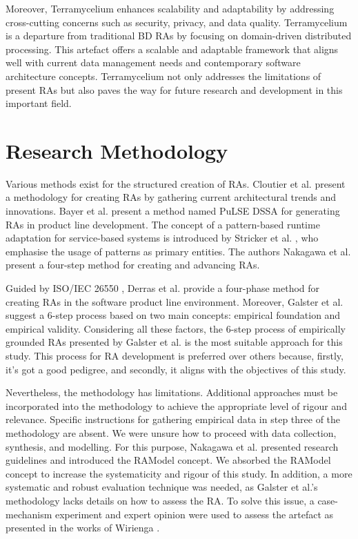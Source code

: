 \documentclass[review]{elsarticle}
\begin{document}
Moreover, Terramycelium enhances scalability and adaptability by addressing cross-cutting concerns such as security, privacy, and data quality. Terramycelium is a departure from traditional BD RAs by focusing on domain-driven distributed processing. This artefact offers a scalable and adaptable framework that aligns well with current data management needs and contemporary software architecture concepts. Terramycelium not only addresses the limitations of present RAs but also paves the way for future research and development in this important field.

\section{Research Methodology}

Various methods exist for the structured creation of RAs. Cloutier et al. \cite{Cloutier2010} present a methodology for creating RAs by gathering current architectural trends and innovations. Bayer et al. \cite{bayer1999pulse} present a method named PuLSE DSSA for generating RAs in product line development. The concept of a pattern-based runtime adaptation for service-based systems is introduced by Stricker et al. \cite{stricker2010creating}, who emphasise the usage of patterns as primary entities. The authors Nakagawa et al. \cite{nakagawa2009towards} present a four-step method for creating and advancing RAs. 

Guided by ISO/IEC 26550 \cite{wg2015iso}, Derras et al. \cite{Derras} provide a four-phase method for creating RAs in the software product line environment. Moreover, Galster et al. \cite{GALSTER2011Empirically} suggest a 6-step process based on two main concepts: empirical foundation and empirical validity. Considering all these factors, the 6-step process of empirically grounded RAs presented by Galster et al. is the most suitable approach for this study. This process for RA development is preferred over others because, firstly, it's got a good pedigree, and secondly, it aligns with the objectives of this study.

Nevertheless, the methodology has limitations. Additional approaches must be incorporated into the methodology to achieve the appropriate level of rigour and relevance. Specific instructions for gathering empirical data in step three of the methodology are absent. We were unsure how to proceed with data collection, synthesis, and modelling. For this purpose, Nakagawa et al. \cite{Nakagawa} presented research guidelines and introduced the RAModel concept. We absorbed the RAModel concept to increase the systematicity and rigour of this study. In addition, a more systematic and robust evaluation technique was needed, as Galster et al.'s methodology lacks details on how to assess the RA. To solve this issue, a case-mechanism experiment and expert opinion were used to assess the artefact as presented in the works of Wirienga \cite{wieringa2014design}.
\end{document}
